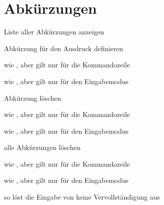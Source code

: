 \documentclass
[
  draft    = true,
  fontsize = 11pt,
  parskip  = half,
  BCOR     = 0pt,
  DIV      = calc,
  ngerman
]
{scrartcl}
\begin{document}
\section{Abkürzungen}
\begin{mytemize}
  \renewcommand{\cmdwidth}{5em}%
  \item {}    Liste aller Abkürzungen anzeigen
  \item {} Abkürzung  für den Ausdruck  definieren
  \item {} wie , aber gilt nur für die Kommandozeile
  \item {} wie , aber gilt nur für den Eingabemodus
  \item {}  Abkürzung  löschen
  \item {} wie , aber gilt nur für die Kommandozeile
  \item {} wie , aber gilt nur für den Eingabemodus
  \item {}   alle Abkürzungen löschen
  \item {}  wie , aber gilt nur für die Kommandozeile
  \item {}  wie , aber gilt nur für den Eingabemodus
  \item {}   so löst die Eingabe von  keine Vervollständigung aus
\end{mytemize}

\end{document}
